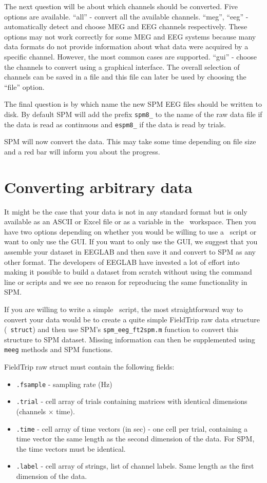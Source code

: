 The next question will be about which channels should be converted. Five options are available. ``all'' - convert all the available channels. ``meg'', ``eeg'' - automatically detect and choose MEG and EEG channels respectively. These options may not work correctly for some MEG and EEG systems because many data formats do not provide information about what data were acquired by a specific channel. However, the most common cases are supported. ``gui'' - choose the channels to convert using a graphical interface. The overall selection of channels can be saved in a file and this file can later be used by choosing the ``file'' option.

The final question is by which name the new SPM EEG files should be written to disk. By default SPM will add the prefix \texttt{spm8\_} to the name of the raw data file if the data is read as continuous and \texttt{espm8\_} if the data is read by trials.

SPM will now convert the data. This may take some time depending on file size and a red bar will inform you about the progress.


\section{Converting arbitrary data}
It might be the case that your data is not in any standard format but is only available as an ASCII or Excel file or as a variable in the \matlab\ workspace. Then you have two options depending on whether you would be willing to use a \matlab\ script or want to only use the GUI. If you want to only use the GUI, we suggest that you assemble your dataset in EEGLAB and then  save it and convert to SPM as any other format. The developers of EEGLAB have invested a lot of effort into making it possible to build a dataset from scratch without using the command line or scripts and we see no reason for reproducing the same functionality in SPM.

If you are willing to write a simple \matlab\ script, the most straightforward way to convert your data would be to create a quite simple FieldTrip raw data structure (\matlab\ \texttt{struct}) and then use SPM's \texttt{spm\_eeg\_ft2spm.m} function to convert this structure to SPM dataset. Missing information can then be supplemented using \texttt{meeg} methods and SPM functions.

FieldTrip raw struct must contain the following fields:

\begin{itemize}
\item \texttt{.fsample} - sampling rate (Hz)
\item \texttt{.trial} - cell array of trials containing matrices with identical dimensions (channels $\times$ time). 
\item \texttt{.time} - cell array of time vectors (in sec) - one cell per trial, containing a time vector the same length as the second dimension of the data. For SPM, the time vectors must be identical.
\item \texttt{.label} - cell array of strings, list of channel labels. Same length as the first dimension of the data.
\end{itemize}

